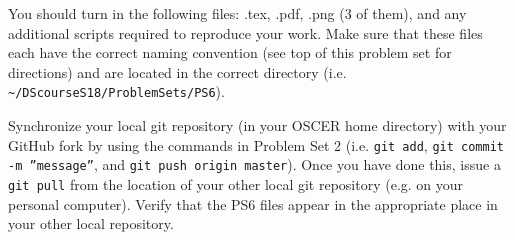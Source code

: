 \documentclass[12pt,english]{exam}
\begin{document}
\begin{questions}
\question You should turn in the following files: .tex, .pdf, .png (3 of them), and any additional scripts required to reproduce your work.  Make sure that these files each have the correct naming convention (see top of this problem set for directions) and are located in the correct directory (i.e. \texttt{\textasciitilde/DScourseS18/ProblemSets/PS6}).

\question Synchronize your local git repository (in your OSCER home directory) with your GitHub fork by using the commands in Problem Set 2 (i.e. \texttt{git add}, \texttt{git commit -m ''message''}, and \texttt{git push origin master}). Once you have done this, issue a \texttt{git pull} from the location of your other local git repository (e.g. on your personal computer). Verify that the PS6 files appear in the appropriate place in your other local repository.

\end{questions}
\end{document}
